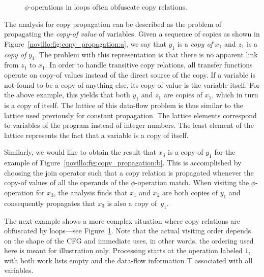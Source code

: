 \begin{figure}[htbp]
  \begin{center}
  \end{center}
  \vspace{-1em}
  \caption{$\phi$-operations in loops often obfuscate copy relations.}
  \label{novillo:fig:copy_propagation_loop}
\end{figure}

The analysis for copy propagation can be described as the problem of
propagating the \emph{copy-of value} of variables.  Given 
a sequence of
copies as shown in Figure~\ref{novillo:fig:copy_propagation:a}, we say that
$y_1$ is a \textit{copy of} $x_1$ and $z_1$ is a \textit{copy of} $y_1$.  The
problem with this representation is that there is no apparent link from $z_1$ to
$x_1$.  In order to handle transitive copy relations, all transfer functions
operate on copy-of values instead of the direct source of the copy.  If a
variable is not found to be a copy of anything else, its copy-of value is the
variable itself. For the above example, this yields that both $y_1$ and $z_1$
are copies of $x_1$, which in turn is a copy of itself. The lattice of this data-flow problem is thus similar to the lattice used previously for constant
propagation. The lattice elements correspond to variables of the
program instead of integer numbers. The least element of the lattice
represents the fact that a variable is a copy of itself.

Similarly, we would like to obtain the result that $x_3$ is a copy of $y_1$ for
the example of Figure~\ref{novillo:fig:copy_propagation:b}. This is
accomplished by choosing the join operator such that a copy relation is
propagated whenever the copy-of values of all the operands of the $\phi$-operation
match. When visiting the $\phi$-operation for $x_3$, the analysis finds
that $x_1$ and $x_2$ are both copies of $y_1$ and consequently propagates that
$x_3$ is also a copy of~$y_1$.

The next example shows a more complex situation where copy relations are
obfuscated by loops---see Figure~\ref{novillo:fig:copy_propagation_loop}.  Note
that the actual visiting order depends on the shape of the CFG and immediate
uses, in other words, the ordering used here is meant for illustration only.
Processing starts
at the operation labeled $1$, with both work lists empty and the data-flow
information $\top$ associated with all variables.


